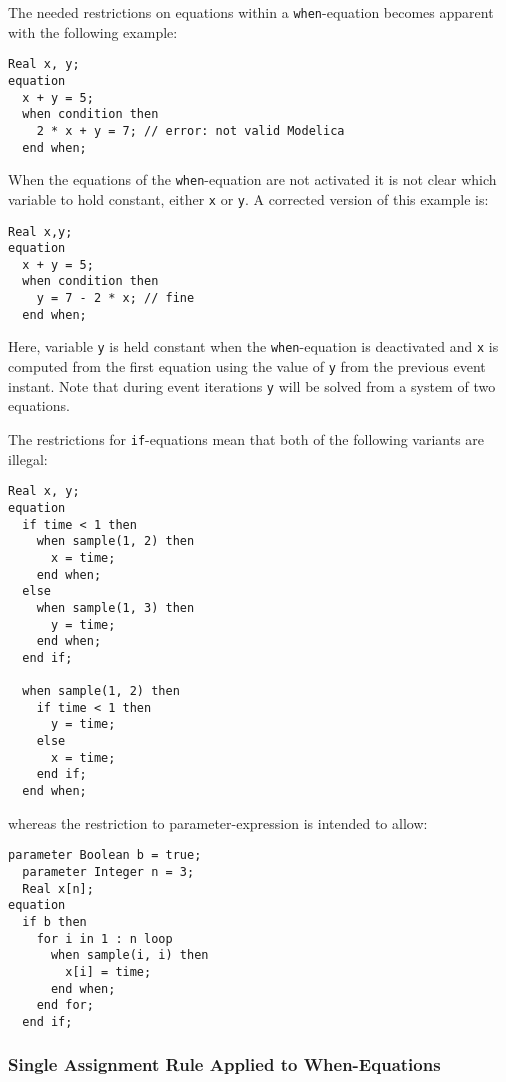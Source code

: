 \begin{nonnormative}
The needed restrictions on equations within a \lstinline!when!-equation becomes apparent with the following example:
\begin{lstlisting}[language=modelica]
  Real x, y;
equation
  x + y = 5;
  when condition then
    2 * x + y = 7; // error: not valid Modelica
  end when;
\end{lstlisting}

When the equations of the \lstinline!when!-equation are not activated it is not clear which variable to hold constant, either \lstinline!x! or \lstinline!y!.
A corrected version of this example is:
\begin{lstlisting}[language=modelica]
  Real x,y;
equation
  x + y = 5;
  when condition then
    y = 7 - 2 * x; // fine
  end when;
\end{lstlisting}
Here, variable \lstinline!y! is held constant when the \lstinline!when!-equation is deactivated and \lstinline!x! is computed from the first equation using the value of \lstinline!y! from the previous event instant.
Note that during event iterations \lstinline!y! will be solved from a system of two equations.
\end{nonnormative}

\begin{example}
The restrictions for \lstinline!if!-equations mean that both of the following variants are illegal:
\begin{lstlisting}[language=modelica]
  Real x, y;
equation
  if time < 1 then
    when sample(1, 2) then
      x = time;
    end when;
  else
    when sample(1, 3) then
      y = time;
    end when;
  end if;

  when sample(1, 2) then
    if time < 1 then
      y = time;
    else
      x = time;
    end if;
  end when;
\end{lstlisting}
whereas the restriction to parameter-expression is intended to allow:
\begin{lstlisting}[language=modelica]
  parameter Boolean b = true;
  parameter Integer n = 3;
  Real x[n];
equation
  if b then
    for i in 1 : n loop
      when sample(i, i) then
        x[i] = time;
      end when;
    end for;
  end if;
\end{lstlisting}
\end{example}

\subsubsection{Single Assignment Rule Applied to When-Equations}\label{application-of-the-single-assignment-rule-to-when-equations}\label{single-assignment-rule-applied-to-when-equations}

